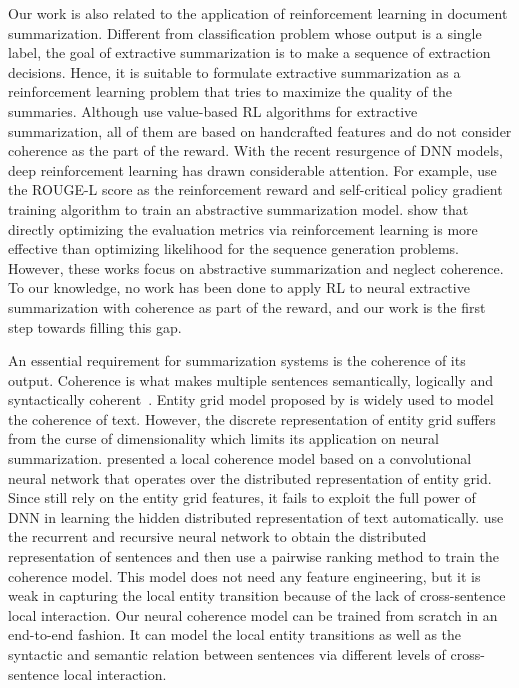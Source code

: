 	Our work is also related to the application of reinforcement learning in document summarization. Different from classification problem whose output is a single label, the goal of extractive summarization is to make a sequence of extraction decisions. Hence, it is suitable to formulate extractive summarization as a reinforcement learning problem that tries to maximize the quality of the summaries. Although \cite{ryang_framework_2012,rioux_fear_2014,hens_s_reinforcement_2015} use value-based RL algorithms for extractive summarization, all of them are based on handcrafted features and do not consider coherence as the part of the reward. With the recent resurgence of DNN models, deep reinforcement learning has drawn considerable attention. For example, \cite{socher2017_summarization} use the ROUGE-L score as the reinforcement reward and self-critical policy gradient training algorithm to train an abstractive summarization model. \cite{ayana2016,sltrnn2016} show that directly optimizing the evaluation metrics via reinforcement learning is more effective than optimizing likelihood for the sequence generation problems. However, these works focus on abstractive summarization and neglect coherence. To our knowledge, no work has been done to apply RL to neural extractive summarization with coherence as part of the reward, and our work is the first step towards filling this gap.

	An essential requirement for summarization systems is the coherence of its output. Coherence is what makes multiple sentences semantically, logically and syntactically coherent~\cite{Yao2017RecentAI}.  Entity grid model proposed by \cite{entitygrid} is widely used to model the coherence of text. However, the discrete representation of entity grid suffers from the curse of dimensionality which limits its application on neural summarization. \cite{nlcm} presented a local coherence model based on a convolutional neural network that operates over the distributed representation of entity grid. Since \cite{nlcm} still rely on the entity grid features, it fails to exploit the full power of DNN in learning the hidden distributed representation of text automatically. \cite{jiweili2014} use the recurrent and recursive neural network to obtain the distributed representation of sentences and then use a pairwise ranking method to train the coherence model. This model does not need any feature engineering, but it is weak in capturing the local entity transition because of the lack of cross-sentence local interaction. Our neural coherence model can be trained from scratch in an end-to-end fashion. It can model the local entity transitions as well as the syntactic and semantic relation between sentences via different levels of cross-sentence local interaction.

